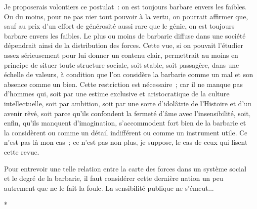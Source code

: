 \documentclass[french,twoside]{book} %
\begin{document}
Je proposerais volontiers ce postulat : on est toujours barbare envers les faibles. Ou du moins, pour ne pas nier tout pouvoir à la vertu, on pourrait affirmer que, sauf au prix d'un effort de générosité aussi rare que le génie, on est toujours barbare envers les faibles. Le plus ou moins de barbarie diffuse dans une société dépendrait ainsi de la distribution des forces. Cette vue, si on pouvait l'étudier assez sérieusement pour lui donner un contenu clair, permet­trait au moins en principe de situer toute structure sociale, soit stable, soit passagère, dans une échelle de valeurs, à condition que l'on considère la barbarie comme un mal et son absence comme un bien. Cette restriction est nécessaire ; car il ne manque pas d'hommes qui, soit par une estime exclusive et aristocratique de la culture intellectuelle, soit par ambition, soit par une sorte d'idolâtrie de l'Histoire et d'un avenir rêvé, soit parce qu'ils confondent la fermeté d'âme avec l'insensibilité, soit, enfin, qu'ils manquent d'imagination, s'accommodent fort bien de la barbarie et la considèrent ou comme un détail indifférent ou comme un instrument utile. Ce n'est pas là mon cas ; ce n'est pas non plus, je suppose, le cas de ceux qui lisent cette revue.\par
\par
Pour entrevoir une telle relation entre la carte des forces dans un système social et le degré de la barbarie, il faut considérer cette dernière nation un peu autrement que ne le fait la foule. La sensibilité publique ne s'émeut...\par

\begin{center}
\noindent \centerline{*}\par
\end{center}
\end{document}
